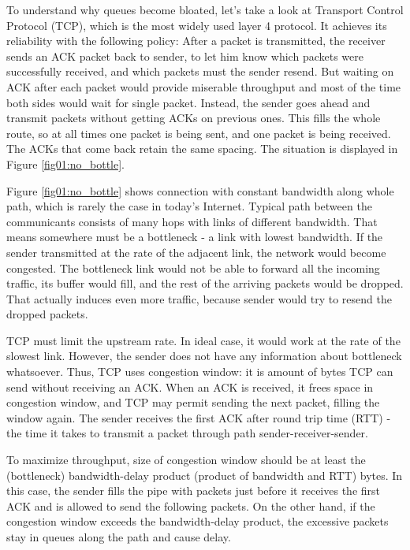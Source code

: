 To understand why queues become bloated, let's take a look at Transport Control Protocol (TCP), which is the most widely used layer 4 protocol. It achieves its reliability with the following policy: After a packet is transmitted, the receiver sends an ACK packet back to sender, to let him know which packets were successfully received, and which packets must the sender resend. But waiting on ACK after each packet would provide miserable throughput and most of the time both sides would wait for single packet. Instead, the sender goes ahead and transmit packets without getting ACKs on previous ones. This fills the whole route, so at all times one packet is being sent, and one packet is being received. The ACKs that come back retain the same spacing. The situation is displayed in Figure \ref{fig01:no_bottle}.

Figure \ref{fig01:no_bottle} shows connection with constant bandwidth along whole path, which is rarely the case in today's Internet. Typical path between the communicants consists of many hops with links of different bandwidth. That means somewhere must be a bottleneck - a link with lowest bandwidth. If the sender transmitted at the rate of the adjacent link, the network would become congested. The bottleneck link would not be able to forward all the incoming traffic, its buffer would fill, and the rest of the arriving packets would be dropped. That actually induces even more traffic, because sender would try to resend the dropped packets.


TCP must limit the upstream rate. In ideal case, it would work at the rate of the slowest link. However, the sender does not have any information about bottleneck whatsoever. Thus, TCP uses congestion window: it is amount of bytes TCP can send without receiving an ACK. When an ACK is received, it frees space in congestion window, and TCP may permit sending the next packet, filling the window again. The sender receives the first ACK after round trip time (RTT) - the time it takes to transmit a packet through path sender-receiver-sender.

To maximize throughput, size of congestion window should be at least the (bottleneck) bandwidth-delay product (product of bandwidth and RTT) bytes. In this case, the sender fills the pipe with packets just before it receives the first ACK and is allowed to send the following packets. On the other hand, if the congestion window exceeds the bandwidth-delay product, the excessive packets stay in queues along the path and cause delay. 


